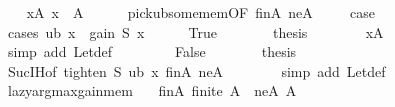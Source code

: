 \begin{isabellebody}
\ \ \isamarkupfalse%
\ xA{\isacharcolon}{\kern0pt}\ {\isachardoublequoteopen}{\isacharquery}{\kern0pt}x\ {\isasymin}\ A{\isachardoublequoteclose}\isanewline
\ \ \ \ \isamarkupfalse%
\ pick{\isacharunderscore}{\kern0pt}ub{\isacharunderscore}{\kern0pt}some{\isacharunderscore}{\kern0pt}mem{\isacharbrackleft}{\kern0pt}OF\ finA\ neA{\isacharbrackright}{\kern0pt}\ \isakeywordONE{{\isachardot}{\kern0pt}}\isamarkupfalse%
\isanewline
\isanewline
\ \ \isamarkupfalse%
\ {\isacharquery}{\kern0pt}case\isanewline
\ \ \isamarkupfalse%
\ {\isacharparenleft}{\kern0pt}cases\ {\isachardoublequoteopen}ub\ {\isacharquery}{\kern0pt}x\ {\isacharequal}{\kern0pt}\ gain\ S\ {\isacharquery}{\kern0pt}x{\isachardoublequoteclose}{\isacharparenright}{\kern0pt}\isanewline
\ \ \ \ \isamarkupfalse%
\ True\isanewline
\ \ \ \ \isamarkupfalse%
\ \isamarkupfalse%
\ {\isacharquery}{\kern0pt}thesis\isanewline
\ \ \ \ \ \ \isamarkupfalse%
\ xA\ \isamarkupfalse%
\ {\isacharparenleft}{\kern0pt}simp\ add{\isacharcolon}{\kern0pt}\ Let{\isacharunderscore}{\kern0pt}def{\isacharparenright}{\kern0pt}\isanewline
\ \ \isamarkupfalse%
\isanewline
\ \ \ \ \isamarkupfalse%
\ False\isanewline
\ \ \ \ \isamarkupfalse%
\ \isamarkupfalse%
\ {\isacharquery}{\kern0pt}thesis\isanewline
\ \ \ \ \ \ \isamarkupfalse%
\ Suc{\isachardot}{\kern0pt}IH{\isacharbrackleft}{\kern0pt}of\ {\isachardoublequoteopen}tighten\ S\ ub\ {\isacharquery}{\kern0pt}x{\isachardoublequoteclose}{\isacharbrackright}{\kern0pt}\ finA\ neA\isanewline
\ \ \ \ \ \ \isamarkupfalse%
\ {\isacharparenleft}{\kern0pt}simp\ add{\isacharcolon}{\kern0pt}\ Let{\isacharunderscore}{\kern0pt}def{\isacharparenright}{\kern0pt}\isanewline
\ \ \isamarkupfalse%
\isanewline
{}\isamarkupfalse%
%
\endisatagproof
{\isafoldproof}%
%
\isadelimproof
\isanewline
%
\endisadelimproof
\isanewline
{}\isamarkupfalse%
\ lazy{\isacharunderscore}{\kern0pt}argmax{\isacharunderscore}{\kern0pt}gain{\isacharunderscore}{\kern0pt}mem{\isacharcolon}{\kern0pt}\isanewline
\ \ \ finA{\isacharcolon}{\kern0pt}\ {\isachardoublequoteopen}finite\ A{\isachardoublequoteclose}\ \ neA{\isacharcolon}{\kern0pt}\ {\isachardoublequoteopen}A\ {\isasymnoteq}\ {\isacharbraceleft}{\kern0pt}{\isacharbraceright}{\kern0pt}{\isachardoublequoteclose}\isanewline

\end{isabellebody}
